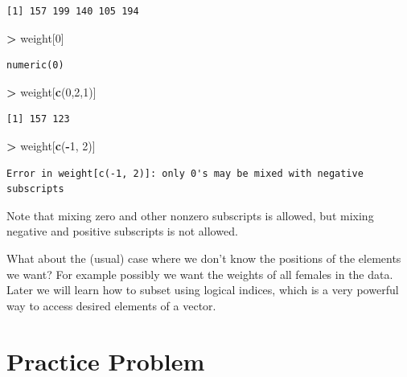 \documentclass[]{krantz}
\makeatletter
\newenvironment{Shaded}{\begin{snugshade}}{\end{snugshade}}
\newcommand{\KeywordTok}[1]{\textcolor[rgb]{0.27,0.27,0.27}{\textbf{#1}}}
\newcommand{\DecValTok}[1]{\textcolor[rgb]{0.06,0.06,0.06}{#1}}
\newcommand{\StringTok}[1]{\textcolor[rgb]{0.5,0.5,0.5}{#1}}
\newcommand{\OperatorTok}[1]{\textcolor[rgb]{0.43,0.43,0.43}{\textbf{#1}}}
\newcommand{\NormalTok}[1]{#1}
\newenvironment{kframe}{%
\medskip{}
\setlength{\fboxsep}{.8em}
 \def\at@end@of@kframe{}%
 \ifinner\ifhmode%
  \def\at@end@of@kframe{\end{minipage}}%
  \begin{minipage}{\columnwidth}%
 \fi\fi%
 \def\FrameCommand##1{\hskip\@totalleftmargin \hskip-\fboxsep
 \colorbox{shadecolor}{##1}\hskip-\fboxsep
     \hskip-\linewidth \hskip-\@totalleftmargin \hskip\columnwidth}%
 \MakeFramed {\advance\hsize-\width
   \@totalleftmargin\z@ \linewidth\hsize
   \@setminipage}}%
 {\par\unskip\endMakeFramed%
 \at@end@of@kframe}
\renewenvironment{Shaded}{\begin{kframe}}{\end{kframe}}
\makeatother
\begin{document}
\begin{verbatim}
[1] 157 199 140 105 194
\end{verbatim}

\begin{Shaded}
\begin{Highlighting}[]
\OperatorTok{>}\StringTok{ }\NormalTok{weight[}\DecValTok{0}\NormalTok{]}
\end{Highlighting}
\end{Shaded}

\begin{verbatim}
numeric(0)
\end{verbatim}

\begin{Shaded}
\begin{Highlighting}[]
\OperatorTok{>}\StringTok{ }\NormalTok{weight[}\KeywordTok{c}\NormalTok{(}\DecValTok{0}\NormalTok{,}\DecValTok{2}\NormalTok{,}\DecValTok{1}\NormalTok{)]}
\end{Highlighting}
\end{Shaded}

\begin{verbatim}
[1] 157 123
\end{verbatim}

\begin{Shaded}
\begin{Highlighting}[]
\OperatorTok{>}\StringTok{ }\NormalTok{weight[}\KeywordTok{c}\NormalTok{(}\OperatorTok{-}\DecValTok{1}\NormalTok{, }\DecValTok{2}\NormalTok{)]}
\end{Highlighting}
\end{Shaded}

\begin{verbatim}
Error in weight[c(-1, 2)]: only 0's may be mixed with negative subscripts
\end{verbatim}

Note that mixing zero and other nonzero subscripts is allowed, but
mixing negative and positive subscripts is not allowed.

What about the (usual) case where we don't know the positions of the
elements we want? For example possibly we want the weights of all
females in the data. Later we will learn how to subset using logical
indices, which is a very powerful way to access desired elements of a
vector.

\section{Practice Problem}\label{practice-problem-1}
\end{document}
